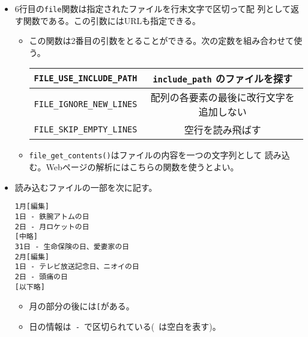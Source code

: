 \begin{Exec}
\begin{itemize}
       に設定している。
\begin{itemize}
 \item ここではコマンドプロンプトからもデバッグで
       きるように、スーパーグローバル\Verb+$_GET+内に値があれば
       (\Verb+isset()+)が\Verb+true+になれば、その値を、そうでなければコ
       マンドからの引数を設定している。
 \item スーパーグローバル\Verb+$argv+はの先頭は呼び出したファイル名であ
       り、その後に引数が順に入る\footnote{C言語の\texttt{main}関数は通
       常、\texttt{int main(int argc, char* argv[])}と宣言される。%
       \texttt{argc}は\texttt{argv}の配列の大きさを表し、渡された引数の
       リストが\texttt{argv[]}に入っている。このとき、\texttt{argv[0]}は実行
       したときのファイル名が入る。}。
\end{itemize}
 \item 6行目の\texttt{file}関数は指定されたファイルを行末文字で区切って配
       列として返す関数である。この引数にはURLも指定できる。
\begin{itemize}
 \item この関数は2番目の引数をとることができる。次の定数を組み合わせて使
       う。
\begin{center}
 \begin{tabular}{|c|c|}\hline
 \Verb+FILE_USE_INCLUDE_PATH+ & \Verb+include_path+ のファイルを探す\\\hline
 \Verb+FILE_IGNORE_NEW_LINES+ & 配列の各要素の最後に改行文字を追加しない
      \\ \hline
  \Verb+FILE_SKIP_EMPTY_LINES+&空行を読み飛ばす \\ \hline
 \end{tabular}
\end{center}
 \item \Verb+file_get_contents()+はファイルの内容を一つの文字列として
       読み込む。Webページの解析にはこちらの関数を使うとよい。
\end{itemize}
 \item 読み込むファイルの一部を次に記す。
\begin{Verbatim}
1月[編集]
1日 - 鉄腕アトムの日
2日 - 月ロケットの日
[中略]
31日 - 生命保険の日、愛妻家の日
2月[編集]
1日 - テレビ放送記念日、ニオイの日
2日 - 頭痛の日
[以下略]
\end{Verbatim}
\begin{itemize}
 \item 月の部分の後には\texttt{[}がある。
 \item 日の情報は\Verb*+ - +で区切られている(\Verb*+ +は空白を表す)。

\end{itemize}
\end{itemize}
\end{Exec}
